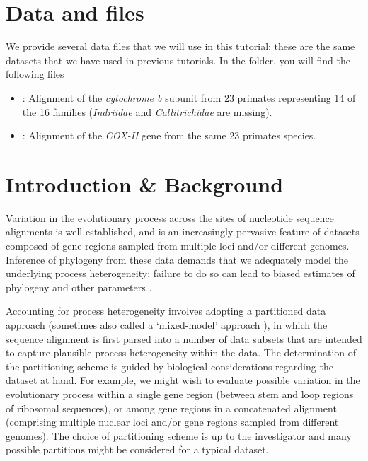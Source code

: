 \section{Data and files}

We provide several data files that we will use in this tutorial; these are the same datasets that we have used in previous tutorials.
In the  folder, you will find the following files
\begin{itemize}
\item
{}: Alignment of the \textit{cytochrome b} subunit from 23 primates representing 14 of the 16 families (\textit{Indriidae} and \textit{Callitrichidae} are missing).
\item
{}: Alignment of the \textit{COX-II} gene from the same 23 primates species.
\end{itemize}



\section{Introduction \& Background}

Variation in the evolutionary process across the sites of nucleotide sequence alignments is well established, and is an increasingly pervasive feature of datasets composed of gene regions sampled from multiple loci and/or different genomes.
Inference of phylogeny from these data demands that we adequately model the underlying process heterogeneity; failure to do so can lead to biased estimates of phylogeny and other parameters \citep{Brown2007}.

Accounting for process heterogeneity involves adopting a partitioned data approach (sometimes also called a `mixed-model' approach \citep{Ronquist2003}), in which the sequence alignment is first parsed into a number of data subsets that are intended to capture plausible process heterogeneity within the data.
The determination of the partitioning scheme is guided by biological considerations regarding the dataset at hand.
For example, we might wish to evaluate possible variation in the evolutionary process within a single gene region (\EG between stem and loop regions of ribosomal sequences), or among gene regions in a concatenated alignment (\EG comprising multiple nuclear loci and/or gene regions sampled from different genomes).
The choice of partitioning scheme is up to the investigator and many possible partitions might be considered for a typical dataset.

